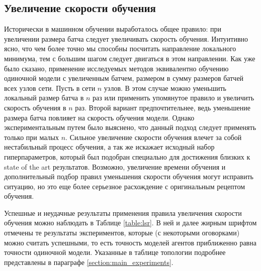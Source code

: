 \documentclass[a4paper,article,14pt]{extarticle}
\begin{document}
\subsection{Увеличение скорости обучения}
Исторически в машинном обучении выработалось \cite{lr_batch} общее правило: при увеличении размера батча следует увеличивать скорость обучения. Интуитивно ясно, что чем более точно мы способны посчитать направление локального минимума, тем с большим шагом следует двигаться в этом направлении. Как уже было сказано, применение исследуемых методов эквивалентно обучению одиночной модели с увеличенным батчем, размером в сумму размеров батчей всех узлов сети. Пусть в сети $n$ узлов. В этом случае можно уменьшить локальный размер батча в $n$ раз или применить упомянутое правило и увеличить скорость обучения в $n$ раз. Второй вариант предпочтительнее, ведь уменьшение размера батча повлияет на скорость обучения модели. Однако экспериментальным путем было выяснено, что данный подход следует применять только при малых $n$. Сильное увеличение скорости обучения влечет за собой нестабильный процесс обучения, а так же искажает исходный набор гиперпараметров, который был подобран специально для достижения близких к state of the art результатов. Возможно, увеличение времени обучения и дополнительный подбор правил уменьшения скорости обучения могут исправить ситуацию, но это еще более серьезное расхождение с оригинальным рецептом обучения.

Успешные и неудачные результаты применения правила увеличения скорости обучения можно наблюдать в Таблице \ref{table:lsr}. В ней и далее жирным шрифтом отмечены те результаты экспериментов, которые (с некоторыми оговорками) можно считать успешными, то есть точность моделей агентов приближенно равна точности одиночной модели. Указанные в таблице топологии подробнее представлены в параграфе \ref{section:main_experiments}.
\end{document}
